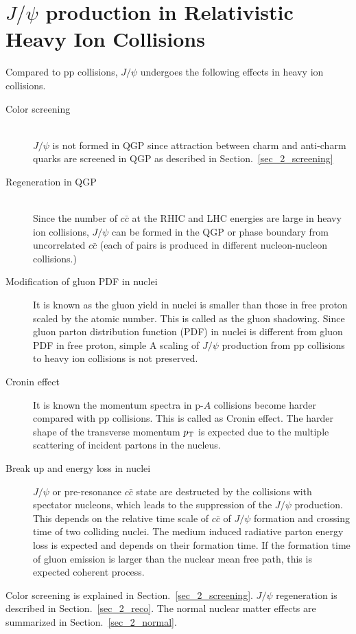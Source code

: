 \section{$J/\psi$ production in Relativistic Heavy Ion Collisions}
\label{sec_2_summary}
Compared to pp collisions, $J/\psi$ undergoes the following effects in heavy ion collisions. 
\begin{description}
  \item[Color screening]\mbox{} \\
	$J/\psi$ is not formed in QGP since attraction between charm and anti-charm quarks are screened in QGP as described in Section.~\ref{sec_2_screening}
  \item[Regeneration in QGP]\mbox{} \\
		Since the number of $c\bar{c}$ at the RHIC and LHC energies are large in heavy ion collisions, $J/\psi$ can be formed in the QGP or phase boundary from uncorrelated $c\bar{c}$ (each of pairs is produced in different nucleon-nucleon collisions.)
  \item [Modification of gluon PDF in nuclei]
	It is known as the gluon yield in nuclei is smaller than those in free proton scaled by the atomic number. 
	This is called  as the gluon shadowing. Since gluon parton distribution function (PDF) in nuclei is different from gluon PDF in free proton, simple A scaling of $J/\psi$ production from pp collisions to heavy ion collisions is not preserved.
  \item [Cronin effect]
	It is known	the momentum spectra in p-$A$ collisions become harder compared with pp collisions. 
	This is called as Cronin effect. 
	The harder shape of the transverse momentum $p_{\rm{T}}$ is expected due to the multiple scattering of incident partons in the nucleus. 
   \item [Break up and energy loss in nuclei]
	$J/\psi$ or pre-resonance $c\bar{c}$ state are destructed by the collisions with spectator nucleons, which leads to the suppression of the $J/\psi$ production. 
	This depends on the relative time scale of $c\bar{c}$ of $J/\psi$ formation and crossing time of two colliding nuclei. 
	The medium induced radiative parton energy loss is expected  and depends on their formation time. 
	If the formation time of gluon emission is larger than the nuclear mean free path, this is expected coherent process. 
\end{description}
Color screening is explained in Section.~\ref{sec_2_screening}.
$J/\psi$ regeneration is described in Section.~\ref{sec_2_reco}.
The normal nuclear matter effects are summarized in Section.~\ref{sec_2_normal}.

